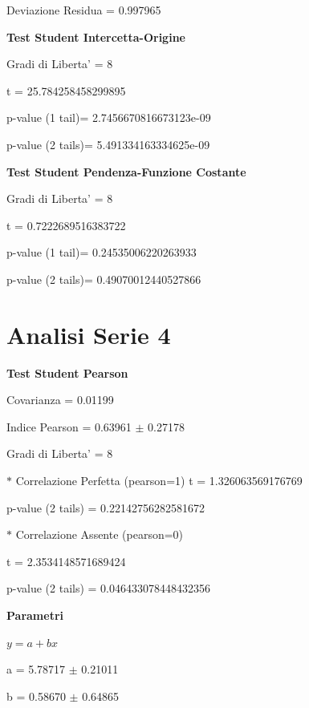 \documentclass{article}
\begin{document}
Deviazione Residua = 0.997965

\textbf{Test Student Intercetta-Origine}

Gradi di Liberta' = 8

t = 25.784258458299895

p-value (1 tail)= 2.7456670816673123e-09

p-value (2 tails)= 5.491334163334625e-09

\textbf{Test Student Pendenza-Funzione Costante}

Gradi di Liberta' = 8

t = 0.7222689516383722

p-value (1 tail)= 0.24535006220263933

p-value (2 tails)= 0.49070012440527866

\section*{Analisi Serie 4}

\textbf{Test Student Pearson}

Covarianza = 0.01199

Indice Pearson = 0.63961 $\pm$ 0.27178

Gradi di Liberta' = 8

$\ast$ Correlazione Perfetta (pearson=1)
t = 1.326063569176769

p-value (2 tails) = 0.22142756282581672

$\ast$ Correlazione Assente (pearson=0)

t = 2.3534148571689424

p-value (2 tails) = 0.046433078448432356

\textbf{Parametri}

$y = a + bx$

a = 5.78717 $\pm$ 0.21011

b = 0.58670 $\pm$ 0.64865
\end{document}
